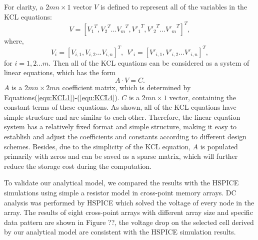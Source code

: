 For clarity, a ${2mn\times 1}$ vector ${V}$ is defined to represent all of the variables in the KCL equations:
\begin{equation}\label{equ:V1}
{V}=[{V_1}^T,{V_2}^T...{V_m}^T,{V'_1}^T,{V'_2}^T...{V'_m}^T]^T,
\end{equation}
where,
\begin{equation}\label{equ:V2}
{V_i} = [V_{i,1},V_{i,2}...V_{i,n}]^T,~~{V'_i} = [V'_{i,1},V'_{i,2}...V'_{i,n}]^T,
\end{equation}
for $i=1,2...m$. Then all of the KCL equations can be considered as a
system of linear equations, which has the form
\begin{equation}\label{equ:matrix}
A\cdot V = C.
\end{equation}
$A$ is a ${2mn\times{2mn}}$ coefficient matrix, which is determined by
Equations(\ref{equ:KCL1})-(\ref{equ:KCL4}). $C$ is a ${2mn\times{1}}$
vector, containing the constant terms of these equations. As shown, all of
the KCL equations have simple structure and are similar to each
other. Therefore, the linear equation system has a relatively fixed format
and simple structure, making it easy to establish and adjust the
coefficients and constants according to different design schemes. Besides,
due to the simplicity of the KCL equation, $A$ is populated primarily with
zeros and can be saved as a sparse matrix, which will further reduce the
storage cost during the computation.

To validate our analytical model, we compared the results with the HSPICE
simulations using simple a resistor model in cross-point memory arrays. DC
analysis was performed by HSPICE which solved the voltage of every node in
the array. The results of eight cross-point arrays with different array
size and specific data pattern are shown in Figure ??, the voltage drop on
the selected cell derived by our analytical model are consistent with the
HSPICE simulation results.

